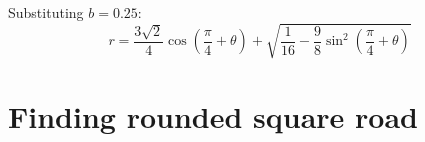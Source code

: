 \documentclass[12pt]{article}
\begin{document}
        Substituting $b=0.25$:
        \begin{equation}
            r = \frac{3\sqrt{2}}{4} \cos (\frac{\pi}{4} + \theta) + \sqrt{\frac{1}{16} - \frac{9}{8} \sin^2 (\frac{\pi}{4}+\theta)}
        \end{equation}

    \section{Finding rounded square road}

        

    \newpage
    
    

    
    
    
        
\end{document}
